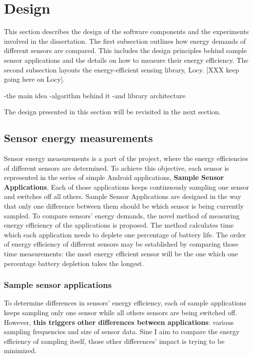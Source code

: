 \section{Design}
\label{s:design}
\hspace{10pt} This section describes the design of the software components and the experiments involved in the dissertation. The first subsection outlines how energy demands of different sensors are compared. This includes the design principles behind sample sensor applications and the details on how to measure their energy efficiency. The second subsection layouts the energy-efficient sensing library, Locy. [XXX keep going here on Locy]. 

-the main idea
-algorithm behind it
-and library architecture

The design presented in this section will be revisited in the next section.

\subsection{Sensor energy measurements}
\label{s:design:measurements}
\hspace{10pt} Sensor energy measurements is a part of the project, where the energy efficiencies of different sensors are determined. To achieve this objective, each sensor is represented in the series of simple Android applications, \textbf{Sample Sensor Applications}. Each of those applications keeps continuously sampling one sensor and switches off all others. Sample Sensor Applications are designed in the way that only one difference between them should be which sensor is being currently sampled. To compare sensors' energy demands, the novel method of measuring energy efficiency of the applications is proposed. The method calculates time which each application needs to deplete one percentage of battery life. The order of energy efficiency of different sensors may be established by comparing those time measurements: the most energy efficient sensor will be the one which one percentage battery depletion takes the longest. 

\subsubsection{Sample sensor applications}
\label{s:design:measurements:sampleapps}
\hspace{10pt} To determine differences in sensors' energy efficiency, each of sample applications keeps sampling only one sensor while all others sensors are being switched off.  However, \textbf{this triggers other differences between applications}: various sampling frequencies and size of sensor data. Sine I aim to compare the energy efficiency of sampling itself, those other differences' impact is trying to be minimized. 

